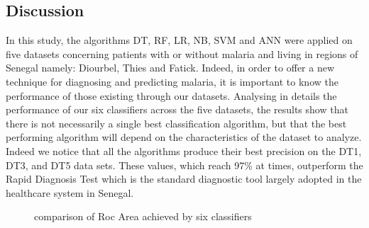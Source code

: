 \subsection{Discussion}
In this study, the algorithms DT, RF, LR, NB, SVM and ANN were applied on five datasets concerning patients with or without malaria and living in regions of Senegal namely: Diourbel, Thies and Fatick. Indeed, in order to offer a new technique for diagnosing and predicting malaria, it is important to know the performance of those existing through our datasets.
Analysing in details the performance of our six classifiers across the five datasets, the results show that there is not necessarily a single best classification algorithm, but that the best performing algorithm will depend on the characteristics of the dataset to analyze. Indeed we notice that all the algorithms produce their best precision on the DT1, DT3, and DT5 data sets. These values, which reach 97\% at times, outperform the Rapid Diagnosis Test which is the standard diagnostic tool largely adopted in the healthcare system in Senegal.
\begin{figure}
\caption{comparison of Roc Area achieved by six classifiers}
\end{figure}
